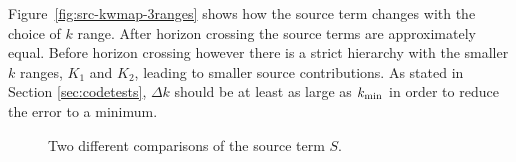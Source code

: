 % 
Figure~\ref{fig:src-kwmap-3ranges} shows how the source term changes
with the choice of $k$ range.  After horizon crossing the source terms
are approximately equal. Before horizon crossing however there is a
strict hierarchy with the smaller $k$ ranges, $K_1$ and $K_2$, leading to smaller source
contributions.  As stated in Section \ref{sec:codetests}, $\Delta k$
should be at least as large as $k_{\mathrm{min}}$ in order to reduce the error to
a minimum.
% 
\begin{figure}
% 
\caption{Two different comparisons of the source term $S$.}
\label{fig:src-comparisons}
\end{figure}
% 
% 



